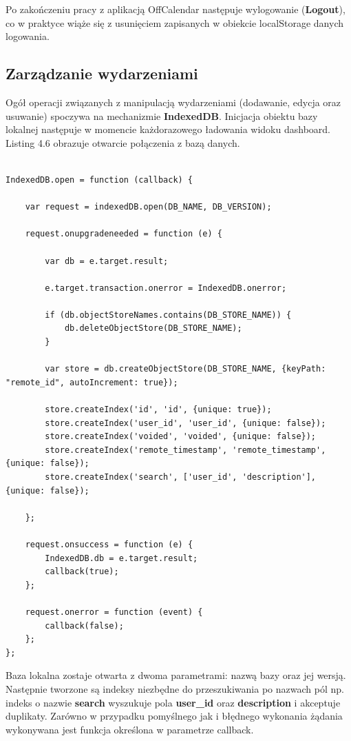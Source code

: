 Po zakończeniu pracy z aplikacją OffCalendar następuje wylogowanie (\textbf{Logout}), co w praktyce wiąże się z usunięciem zapisanych w obiekcie localStorage danych logowania.

\subsection{Zarządzanie wydarzeniami}
\label{sec:zarzWyd}

Ogół operacji związanych z manipulacją wydarzeniami (dodawanie, edycja oraz usuwanie) spoczywa na mechanizmie \textbf{IndexedDB}. Inicjacja obiektu bazy lokalnej następuje w momencie każdorazowego ładowania widoku dashboard. Listing 4.6 obrazuje otwarcie połączenia z bazą danych.

\begin{lstlisting}[caption=Otwarcie połączenia z lokalną bazą danych., label=amb, captionpos=b]

IndexedDB.open = function (callback) {

    var request = indexedDB.open(DB_NAME, DB_VERSION);

    request.onupgradeneeded = function (e) {

        var db = e.target.result;

        e.target.transaction.onerror = IndexedDB.onerror;

        if (db.objectStoreNames.contains(DB_STORE_NAME)) {
            db.deleteObjectStore(DB_STORE_NAME);
        }

        var store = db.createObjectStore(DB_STORE_NAME, {keyPath: "remote_id", autoIncrement: true});

        store.createIndex('id', 'id', {unique: true});
        store.createIndex('user_id', 'user_id', {unique: false});
        store.createIndex('voided', 'voided', {unique: false});
        store.createIndex('remote_timestamp', 'remote_timestamp', {unique: false});
        store.createIndex('search', ['user_id', 'description'], {unique: false});

    };

    request.onsuccess = function (e) {
        IndexedDB.db = e.target.result;
        callback(true);
    };

    request.onerror = function (event) {
        callback(false);
    };
};

\end{lstlisting}

Baza lokalna zostaje otwarta z dwoma parametrami: nazwą bazy oraz jej wersją. Następnie tworzone są indeksy niezbędne do przeszukiwania po nazwach pól np. indeks o nazwie \textbf{search} wyszukuje pola \textbf{user\_id} oraz \textbf{description} i akceptuje duplikaty. Zarówno w przypadku pomyślnego jak i błędnego wykonania żądania wykonywana jest funkcja określona w parametrze callback. 

